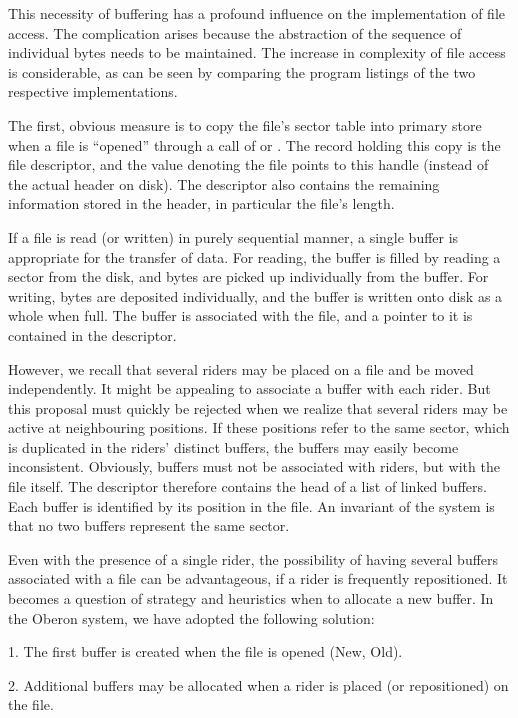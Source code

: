 This necessity of buffering has a profound influence on the implementation of file access. The complication arises because the abstraction of the sequence of individual bytes needs to be maintained. The increase in complexity of file access is considerable, as can be seen by comparing the program listings of the two respective implementations.

The first, obvious measure is to copy the file's sector table into primary store when a file is ``opened'' through a call of  or . The record holding this copy is the file descriptor, and the value  denoting the file points to this handle (instead of the actual header on disk). The descriptor also contains the remaining information stored in the header, in particular the file's length.

If a file is read (or written) in purely sequential manner, a single buffer is appropriate for the transfer of data. For reading, the buffer is filled by reading a sector from the disk, and bytes are picked up individually from the buffer. For writing, bytes are deposited individually, and the buffer is written onto disk as a whole when full. The buffer is associated with the file, and a pointer to it is contained in the descriptor.

However, we recall that several riders may be placed on a file and be moved independently. It might be appealing to associate a buffer with each rider. But this proposal must quickly be rejected when we realize that several riders may be active at neighbouring positions. If these positions refer to the same sector, which is duplicated in the riders' distinct buffers, the buffers may easily become inconsistent. Obviously, buffers must not be associated with riders, but with the file itself. The descriptor therefore contains the head of a list of linked buffers. Each buffer is identified by its position in the file. An invariant of the system is that no two buffers represent the same sector.

Even with the presence of a single rider, the possibility of having several buffers associated with a file can be advantageous, if a rider is frequently repositioned. It becomes a question of strategy and heuristics when to allocate a new buffer. In the Oberon system, we have adopted the following solution:

1. The first buffer is created when the file is opened (New, Old).

2. Additional buffers may be allocated when a rider is placed (or repositioned) on the file.

